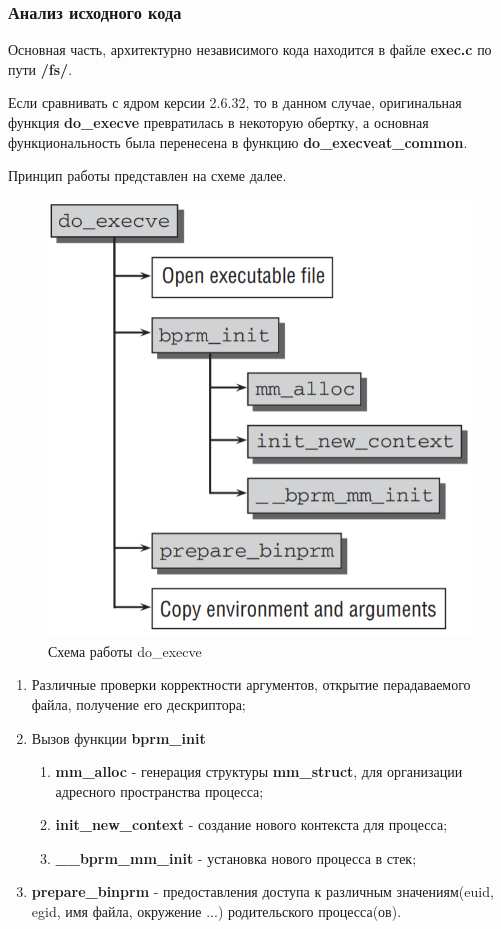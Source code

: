 \subsubsection{Анализ исходного кода}
Основная часть, архитектурно независимого кода находится в файле \textbf{exec.c} по пути \textbf{/fs/}.

Если сравнивать с ядром керсии 2.6.32, то в данном случае, оригинальная функция \textbf{do\_execve} превратилась в некоторую обертку, а основная функциональность была перенесена в функцию \textbf{do\_execveat\_common}.

Принцип работы представлен на схеме далее.
\begin{figure}[H]
  \centering
  \includegraphics[width=.6\textwidth]{img/do_execve}
  \caption{Схема работы do\_execve}
\end{figure}
\begin{enumerate}
\item Различные проверки корректности аргументов, открытие перадаваемого файла, получение его дескриптора;
\item Вызов функции \textbf{bprm\_init}
\begin{enumerate}
\item \textbf{mm\_alloc} - генерация структуры \textbf{mm\_struct}, для организации адресного пространства процесса;
\item \textbf{init\_new\_context} - создание нового контекста для процесса;
\item \textbf{\_\_bprm\_mm\_init} - установка нового процесса в стек;
\end{enumerate}
\item \textbf{prepare\_binprm} - предоставления доступа к различным значениям(euid, egid, имя файла, окружение ...) родительского процесса(ов).
\end{enumerate}

